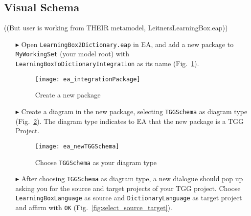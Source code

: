 \newpage
\hypertarget{schema vis}{}
\subsection{Visual Schema}
\visHeader

((But user is working from THEIR metamodel, LeitnersLearningBox.eap))

\begin{itemize}

\item[$\blacktriangleright$] Open \texttt{LearningBox2Dictionary.eap} in EA, and add a new package to \texttt{MyWorkingSet} (your model root) with
\texttt{Learning\-Box\-To\-Dictionary\-Integration} as its name (Fig.~\ref{fig:intgPackage}). 

\vspace{0.5cm}

\begin{figure}[htbp]
\begin{center}
  \texttt{[image: ea\_integrationPackage]}
  \caption{Create a new package}  
  \label{fig:intgPackage}
\end{center}
\end{figure}


\item[$\blacktriangleright$] Create a diagram in the new package, selecting \texttt{TGGSchema} as diagram type (Fig.~\ref{fig:tgg_diagram_type}). The diagram
type indicates to EA that the new package is a TGG Project.

\vspace{0.5cm}

\begin{figure}[htbp]
\begin{center}
  \texttt{[image: ea\_newTGGSchema]}
  \caption{Choose \texttt{TGGSchema} as your diagram type}  
  \label{fig:tgg_diagram_type}
\end{center}
\end{figure}

\item[$\blacktriangleright$] After choosing \texttt{TGGSchema} as diagram type, a new dialogue should pop up asking you for the source and target projects of your TGG project. 
Choose \texttt{Learning\-Box\-Language} as source and \texttt{Dictionary\-Language} as target project and affirm with \texttt{OK} (Fig.~\ref{fig:select_source_target}).

\vspace{0.5cm}


\end{itemize}
